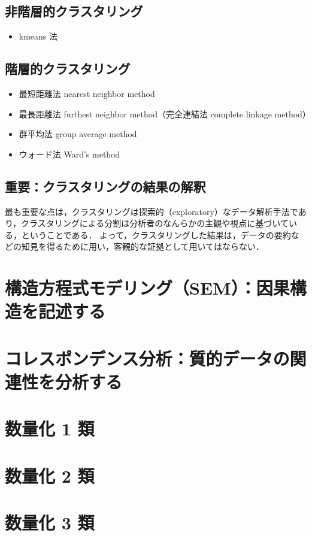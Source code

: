 \subsection{非階層的クラスタリング}

\begin{itemize}
  \item kmeans 法
\end{itemize}

\subsection{階層的クラスタリング}

\begin{itemize}
  \item 最短距離法 nearest neighbor method
  \item 最長距離法 furthest neighbor method（完全連結法 complete linkage method）
  \item 群平均法 group average method
  \item ウォード法 Ward's method
\end{itemize}

\subsection{重要：クラスタリングの結果の解釈}

最も重要な点は，クラスタリングは探索的（exploratory）なデータ解析手法であり，クラスタリングによる分割は分析者のなんらかの主観や視点に基づいている，ということである．
よって，クラスタリングした結果は，データの要約などの知見を得るために用い，客観的な証拠として用いてはならない．

\section{構造方程式モデリング（SEM）：因果構造を記述する}
\section{コレスポンデンス分析：質的データの関連性を分析する}
\section{数量化 1 類}
\section{数量化 2 類}
\section{数量化 3 類}


